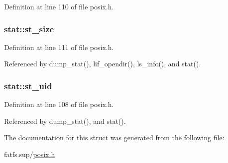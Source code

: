 Definition at line 110 of file posix.\+h.

\subsubsection[{\texorpdfstring{st\+\_\+size}{st_size}}]{ stat\+::st\+\_\+size}\hypertarget{structstat_a040e19c8b9766f841fde8786ce9297bf}{}\label{structstat_a040e19c8b9766f841fde8786ce9297bf}


Definition at line 111 of file posix.\+h.



Referenced by dump\+\_\+stat(), lif\+\_\+opendir(), ls\+\_\+info(), and stat().

\subsubsection[{\texorpdfstring{st\+\_\+uid}{st_uid}}]{ stat\+::st\+\_\+uid}\hypertarget{structstat_a4a8708a3d18be60ee7b2f06c4cab0c70}{}\label{structstat_a4a8708a3d18be60ee7b2f06c4cab0c70}


Definition at line 108 of file posix.\+h.



Referenced by dump\+\_\+stat(), and stat().



The documentation for this struct was generated from the following file\+:\begin{DoxyCompactItemize}
\item 
fatfs.\+sup/\hyperlink{posix_8h}{posix.\+h}\end{DoxyCompactItemize}

